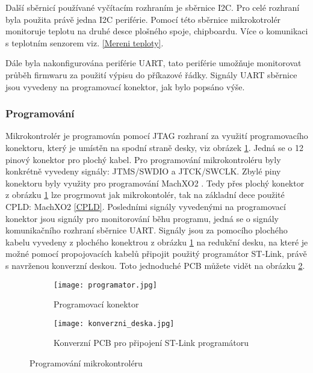  	\par Další sběrnicí používané vyčítacím rozhraním je sběrnice I2C. Pro celé rozhraní byla použita právě jedna I2C periférie. Pomocí této sběrnice mikrokotrolér monitoruje teplotu na druhé desce plošného spoje, chipboardu. Více o komunikaci s teplotním senzorem viz. \ref{Mereni teploty}.
 	
 	\par Dále byla nakonfigurována periférie UART, tato periférie umožňuje monitorovat průběh firmwaru za použití výpisu do příkazové řádky. Signály UART sběrnice jsou vyvedeny na programovací konektor, jak bylo popsáno výše.

	\subsubsection{Programování}
	Mikrokontrolér je programován pomocí JTAG rozhraní za využití programovacího konektoru, který je umístěn na spodní straně desky, viz obrázek \ref{fig:programator}. Jedná se o 12 pinový konektor pro plochý kabel. Pro programování mikrokontroléru byly konkrétně vyvedeny signály: JTMS/SWDIO a JTCK/SWCLK. Zbylé piny konektoru byly využity pro programování MachXO2 \cite{CPLD}. Tedy přes plochý konektor z obrázku \ref{fig:programator} lze progrmovat jak mikrokontolér, tak na základní dece použité CPLD: MachXO2 \ref{CPLD}. Posledními signály vyvedenými na programovací konektor jsou signály pro monitorování běhu programu, jedná se o signály komunikačního rozhraní sběrnice UART. Signály jsou za pomocího plochého kabelu vyvedeny z plochého konektrou z obrázku \ref{fig:programator} na redukční desku, na které je možné pomocí propojovacích kabelů připojit použitý programátor ST-Link, právě s navrženou konverzní deskou. Toto jednoduché PCB můžete vidět na obrázku \ref{fig:konverzni_deska}. 
\begin{figure}[h!]
	\begin{subfigure}{0.5\textwidth}
		\centering
		\captionsetup{justification=centering}
		\texttt{[image: programator.jpg]}
		\caption{Programovací konektor} 
		\label{fig:programator}
	\end{subfigure}
	\begin{subfigure}{0.5\textwidth}
		\centering
		\captionsetup{justification=centering}
		\texttt{[image: konverzni\_deska.jpg]}
		\caption{Konverzní PCB pro připojení ST-Link programátoru} 
		\label{fig:konverzni_deska}
	\end{subfigure}
	\caption{Programování mikrokontroléru}
	\label{fig:programovani}
\end{figure} 


